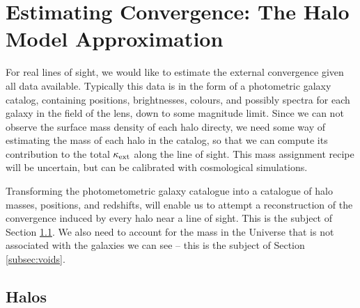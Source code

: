 \documentclass[useAMS,usenatbib]{mn2e}
\begin{document}



\section{Estimating Convergence: The Halo Model Approximation}
\label{sec:model}

For real lines of sight, we would like to estimate the external convergence given all
data available. Typically this data is in the form of a photometric galaxy
catalog, containing positions, brightnesses, colours, and possibly spectra for each galaxy in the
field of the lens, down to some magnitude
limit. Since we can not observe the surface mass density of each halo
directy, we need some way of estimating
the mass of each halo in the catalog, so that we can compute its
contribution to the total $\kappa_{\rm ext}$ along the line of sight. This mass assignment recipe will be uncertain, but
can be calibrated with cosmological simulations.

Transforming the photometometric galaxy catalogue into a  catalogue of
halo masses, positions, and redshifts, will enable us to attempt a
reconstruction of the convergence induced by every halo near a line of sight.
This is the subject of Section \ref{subsec:halos}. We also need to account for
the mass in the Universe that is not associated with the galaxies we can see
-- this is the subject of Section \ref{subsec:voids}. 



\subsection{Halos}
\label{subsec:halos}
\end{document}

